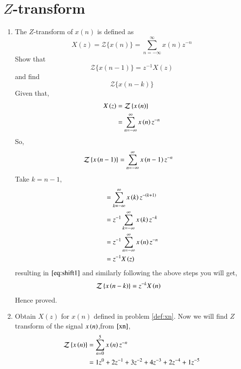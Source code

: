 \documentclass[journal,12pt,twocolumn]{IEEEtran}
\renewcommand\thesection{\arabic{section}}
\begin{document}
\section{$Z$-transform}
\begin{enumerate}[label=\thesection.\arabic*]
\item The $Z$-transform of $x(n)$ is defined as 
%
\begin{equation}
\label{eq:z_trans}
X(z)={\mathcal {Z}}\{x(n)\}=\sum _{n=-\infty }^{\infty }x(n)z^{-n}
\end{equation}
%
Show that
\begin{equation}
\label{eq:shift1}
{\mathcal {Z}}\{x(n-1)\} = z^{-1}X(z)
\end{equation}
and find
\begin{equation}
	{\mathcal {Z}}\{x(n-k)\} 
\end{equation}
\solution Given that,
  \begin{align}
     X\left(z\right) &= \mathcal{Z}\left\{x\left(n\right)\right\}\\
               &= \sum_{n = -\infty}^{\infty}x\left(n\right)z^{-n}
  \end{align}
  So,
   \begin{align}
     \mathcal{Z}\left\{x\left(n-1\right)\right\} &= \sum_{n=-\infty}^{\infty}x\left(n-1\right)z^{-n}
   \end{align}
   Take $k = n-1$,
   \begin{align}
           &= \sum_{k=-\infty}^{\infty}x\left(k\right)z^{-\left(k+1\right)}\\
           &= z^{-1}\sum_{k=-\infty}^{\infty}x\left(k\right)z^{-k}\\
           &= z^{-1}\sum_{n=-\infty}^{\infty}x\left(n\right)z^{-n}\\
           &= z^{-1}X\left(z\right)    
   \end{align}
   resulting in $\eqref{eq:shift1}$ and similarly following the above steps you will get,
     \begin{align}
          \mathcal{Z}\left\{x\left(n-k\right)\right\} &= z^{-k}X\left(n\right)\label{shift_k_Z_transform}
     \end{align} 
   Hence proved.
    \item Obtain $X(z)$ for $x(n)$ defined in problem 
    \ref{def:xn}.
    \solution 
    Now we will find $Z$ transform of the signal $x\left(n\right)$,from $\eqref{xn}$,
    \begin{align}
      \mathcal{Z}\cbrak{x\brak{n}} &= \sum_{n=0}^{5}x\brak{n}z^{-n}\\
                                   &= 1z^{0} + 2z^{-1} + 3z^{-2}+4z^{-3} + 2z^{-4} +1z^{-5}\\

\end{align}
\end{enumerate}
\end{document}
